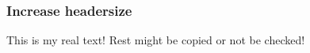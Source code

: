 \subsubsection{Increase headersize} \label{subsubsection:evaluation-reengineering-break-headersize}
This is my real text! Rest might be copied or not be checked!
